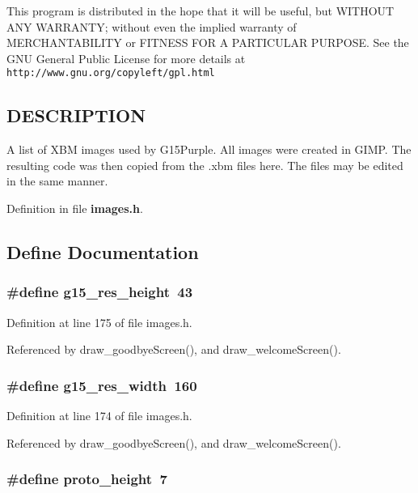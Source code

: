 This program is distributed in the hope that it will be useful, but WITHOUT ANY WARRANTY; without even the implied warranty of MERCHANTABILITY or FITNESS FOR A PARTICULAR PURPOSE. See the GNU General Public License for more details at {\tt http://www.gnu.org/copyleft/gpl.html}\subsection{DESCRIPTION}\label{main_DESCRIPTION}
A list of XBM images used by G15Purple. All images were created in GIMP. The resulting code was then copied from the .xbm files here. The files may be edited in the same manner. 

Definition in file {\bf images.h}.

\subsection{Define Documentation}
\subsubsection{\setlength{\rightskip}{0pt plus 5cm}\#define g15\_\-res\_\-height~43}\label{images_8h_ee1a49223a9ce3d73c8474c6f283fdcf}




Definition at line 175 of file images.h.

Referenced by draw\_\-goodbyeScreen(), and draw\_\-welcomeScreen().
\subsubsection{\setlength{\rightskip}{0pt plus 5cm}\#define g15\_\-res\_\-width~160}\label{images_8h_267fd5751387521eb6b389be6d432d29}




Definition at line 174 of file images.h.

Referenced by draw\_\-goodbyeScreen(), and draw\_\-welcomeScreen().
\subsubsection{\setlength{\rightskip}{0pt plus 5cm}\#define proto\_\-height~7}\label{images_8h_efd8472b7e8165516778802979e15cea}




